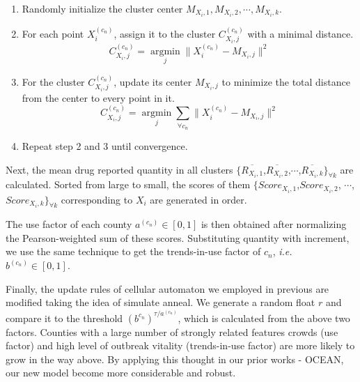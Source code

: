 \documentclass[a4paper]{article}
\begin{document}
\begin{enumerate}
    \item Randomly initialize the cluster center $M_{X_i,1}, M_{X_i,2}, \cdots,M_{X_i,k}$.
    \vspace{6pt}
    \item For each point $X_i^{(c_n)}$, assign it to the cluster $C_{X_i,j}^{(c_n)}​$ with a minimal distance.
    \vspace{6pt}
    \begin{equation}
        C_{X_i,j}^{(c_n)}=\mathop{\arg\min}\limits_{j}\|X_i^{(c_n)}-M_{X_i,j}\|^2
    \end{equation}
    \item For the cluster $C_{X_i,j}^{(c_n)}$, update its center $M_{X_i,j}$ to minimize the total distance from the center to every point in it.
    \vspace{6pt}
    \begin{equation}
        C_{X_i,j}^{(c_n)}=\mathop{\arg\min}\limits_{j}\sum_{\forall c_n}\|X_i^{(c_n)}-M_{X_i,j}\|^2
    \end{equation}
    \item Repeat step 2 and 3 until convergence.
\end{enumerate}

Next, the mean drug reported quantity in all clusters $\{\overline{R_{X_i,1}}$,$\overline{R_{X_i,2}}$,$\cdots$,$\overline{R_{X_i,k}}\}_{\forall k}$ are calculated. Sorted from large to small, the scores of them $\{Score_{X_i,1}$,$Score_{X_i,2}$, $\cdots$,$Score_{X_i,k}\}_{\forall k}$ corresponding to $X_i$ are generated in order. 

The use factor of each county $a^{(c_n)}\in[0,1]$ is then obtained after normalizing the Pearson-weighted sum of these scores. Substituting quantity with increment, we use the same technique to get the trends-in-use factor of $c_n$, \textit{i.e.} $b^{(c_n)}\in[0,1]$.

Finally, the update rules of cellular automaton we employed in previous are modified taking the idea of simulate anneal. We generate a random float $r$ and compare it to the threshold ${(b^{c_n})}^{\tau/a^{(c_n)}}$, which is calculated from the above two factors. Counties with a large number of strongly related features crowds (use factor) and high level of outbreak vitality (trends-in-use factor) are more likely to grow in the way above.  By applying this thought in our prior works - OCEAN, our new model become more considerable and robust. 
\end{document}
